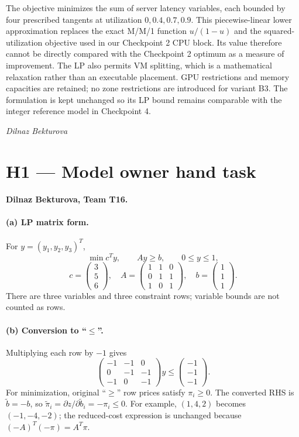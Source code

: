 \documentclass[10pt]{article}
\begin{document}
The objective minimizes the sum of server latency variables, each bounded
by four prescribed tangents at utilization $0,0.4,0.7,0.9$.
This piecewise-linear lower approximation replaces the exact M/M/1
function $u/(1-u)$ and the squared-utilization objective used in our
Checkpoint 2 CPU block. Its value therefore cannot be directly compared
with the Checkpoint 2 optimum as a measure of improvement.
The LP also permits VM splitting, which is a mathematical relaxation
rather than an executable placement. GPU restrictions and memory capacities
are retained; no zone restrictions are introduced for variant B3.
The formulation is kept unchanged so its LP bound remains comparable
with the integer reference model in Checkpoint 4.
\begin{flushright}\textit{Dilnaz Bekturova}\end{flushright}

\newpage
\section*{H1 --- Model owner hand task}
\textbf{Dilnaz Bekturova, Team T16.}
\paragraph{(a) LP matrix form.}
For $y=(y_1,y_2,y_3)^T$,
\[
\min c^Ty,\qquad Ay\ge b,\qquad 0\le y\le1,
\]
\[
c=\begin{pmatrix}3\\5\\6\end{pmatrix},\quad
A=\begin{pmatrix}1&1&0\\0&1&1\\1&0&1\end{pmatrix},\quad
b=\begin{pmatrix}1\\1\\1\end{pmatrix}.
\]
There are three variables and three constraint rows; variable bounds
are not counted as rows.
\paragraph{(b) Conversion to ``$\le$''.}
Multiplying each row by $-1$ gives
\[
\begin{pmatrix}-1&-1&0\\0&-1&-1\\-1&0&-1\end{pmatrix}y
\le\begin{pmatrix}-1\\-1\\-1\end{pmatrix}.
\]
For minimization, original ``$\ge$'' row prices satisfy $\pi_i\ge0$.
The converted RHS is $\widetilde b=-b$, so
$\widetilde\pi_i=\partial z/\partial\widetilde b_i=-\pi_i\le0$.
For example, $(1,4,2)$ becomes $(-1,-4,-2)$; the reduced-cost
expression is unchanged because $(-A)^T(-\pi)=A^T\pi$.
\end{document}
